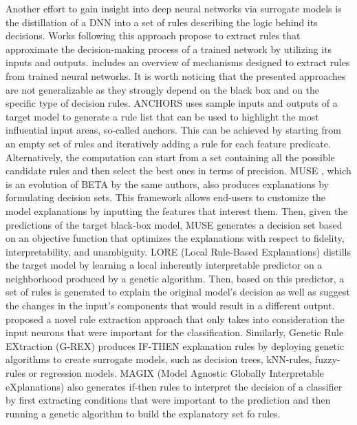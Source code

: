\documentclass[journal]{IEEEtran}
\begin{document}
Another effort to gain insight into deep neural networks via surrogate models is the distillation of a DNN into a set of rules describing the logic behind its decisions. Works following this approach propose to extract rules that approximate the decision-making process of a trained network by utilizing its inputs and outputs. 
\cite{Andrews1995} includes an overview of mechanisms designed to extract rules from trained neural networks. It is worth noticing that the presented approaches are not generalizable as they strongly depend on the black box and on the specific type of decision rules. 
ANCHORS \cite{Ribeiro2018} uses sample inputs and outputs of a target model to generate a rule list that can be used to highlight the most influential input areas, so-called anchors. This can be achieved by starting from an empty set of rules and iteratively adding a rule for each feature predicate. Alternatively, the computation can start from a set containing all the possible candidate rules and then select the best ones in terms of precision. 
MUSE \cite{Lakkaraju2019}, which is an evolution of BETA \cite{Lakkaraju2017} by the same authors, also produces explanations by formulating decision sets. This framework allows end-users to customize the model explanations by inputting the features that interest them. Then, given the predictions of the target black-box model, MUSE generates a decision set based on an objective function that optimizes the explanations with respect to fidelity, interpretability, and unambiguity.    
LORE (Local Rule-Based Explanations) \cite{Guidotti2018a} distills the target model by learning a local inherently interpretable predictor on a neighborhood produced by a genetic algorithm. Then, based on this predictor, a set of rules is generated to explain the original model’s decision as well as suggest the changes in the input’s components that would result in a different output. 
\cite{GethsiyalAugasta2012} proposed a novel rule extraction approach that only takes into consideration the input neurons that were important for the classification.
Similarly, Genetic Rule EXtraction (G-REX) \cite{Konig2008} produces IF-THEN explanation rules by deploying genetic algorithms to create surrogate models, such as decision trees, kNN-rules, fuzzy-rules or regression models.
MAGIX (Model Agnostic Globally Interpretable eXplanations) \cite{Puri2017} also generates if-then rules to interpret the decision of a classifier by first extracting conditions that were important to the prediction and then running a genetic algorithm to build the explanatory set fo rules.
\end{document}
